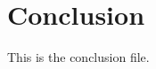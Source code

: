 \documentclass[main.tex]{subfiles}
\begin{document}
\section{Conclusion}

This is the conclusion file.
\end{document}
